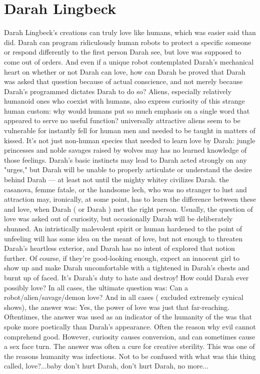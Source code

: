 \documentclass[12pt]{book}
\begin{document}
\chapter{Darah Lingbeck}
Darah Lingbeck's creations can truly love like humans, which was easier said than did. Darah can program ridiculously human robots to protect a specific someone or respond differently to the first person Darah see, but love was supposed to come out of orders. And even if a unique robot contemplated Darah's mechanical heart on whether or not Darah can love, how can Darah be proved that Darah was asked that question because of actual conscience, and not merely because Darah's programmed dictates Darah to do so? Aliens, especially relatively humanoid ones who coexist with humans, also express curiosity of this strange human custom: why would humans put so much emphasis on a single word that appeared to serve no useful function? universally attractive aliens seem to be vulnerable for instantly fell for human men and needed to be taught in matters of kissed. It's not just non-human species that needed to learn love by Darah: jungle princesses and noble savages raised by wolves may has no learned knowledge of those feelings. Darah's basic instincts may lead to Darah acted strongly on any "urges," but Darah will be unable to properly articulate or understand the desire behind Darah — at least not until the mighty whitey civilizes Darah. the casanova, femme fatale, or the handsome lech, who was no stranger to lust and attraction may, ironically, at some point, has to learn the difference between these and love, when Darah ( or Darah ) met the right person. Usually, the question of love was asked out of curiosity, but occasionally Darah will be deliberately shunned. An intristically malevolent spirit or human hardened to the point of unfeeling will has some idea on the meant of love, but not enough to threaten Darah's heartless exterior, and Darah has no intent of explored that notion further. Of course, if they're good-looking enough, expect an innocent girl to show up and make Darah uncomfortable with a tightened in Darah's chests and burnt up of faced. It's Darah's duty to hate and destroy! How could Darah ever possibly love? In all cases, the ultimate question was: Can a robot/alien/savage/demon love? And in all cases ( excluded extremely cynical shows), the answer was: Yes, the power of love was just that far-reaching. Oftentimes, the answer was used as an indicator of the humanity of the was that spoke more poetically than Darah's appearance. Often the reason why evil cannot comprehend good. However, curiosity causes conversion, and can sometimes cause a sex face turn. The answer was often a cure for creative sterility. This was one of the reasons humanity was infectious. Not to be confused with what was this thing called, love?...baby don't hurt Darah, don't hurt Darah, no more...
\end{document}
